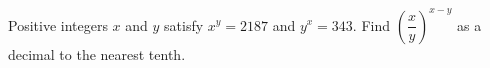Positive integers $x$ and $y$ satisfy $x^y=2187$ and $y^x=343$. Find $\left(\dfrac{x}{y}\right)^{x-y}$ as a decimal to the nearest tenth.
